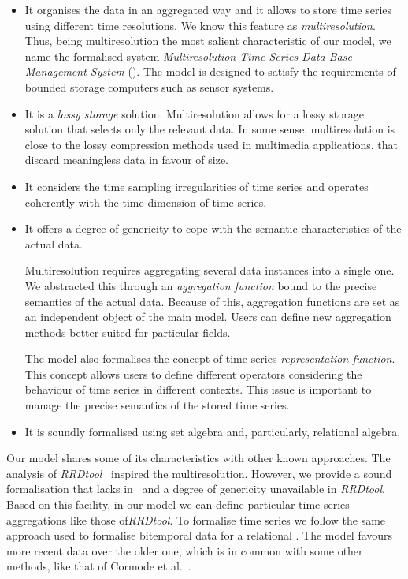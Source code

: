 \begin{itemize}

\item It organises the data in an aggregated way and it allows to
  store time series using different time resolutions. We know this
  feature as \emph{multiresolution}.  Thus, being multiresolution the
  most salient characteristic of our model, we name the formalised
  system \emph{Multiresolution Time Series Data Base Management
    System} ().  The model is designed to satisfy the
  requirements of bounded storage computers such as sensor systems.

\item It is a \emph{lossy storage} solution. Multiresolution allows
  for a lossy storage solution that selects only the relevant data. In
  some sense, multiresolution is close to the lossy compression
  methods used in multimedia applications, that discard meaningless
  data in favour of size.

\item It considers the time sampling irregularities of time series and
  operates coherently with the time dimension of time series.

\item It offers a degree of genericity to cope with the semantic
  characteristics of the actual data.

  Multiresolution requires aggregating several data instances into a
  single one. We abstracted this through an \emph{aggregation
    function} bound to the precise semantics of the actual
  data. Because of this, aggregation functions are set as an
  independent object of the main model.  Users can define new
  aggregation methods better suited for particular fields.

  The model also formalises the concept of time series
  \emph{representation function}.  This concept allows users to define
  different operators considering the behaviour of time series in
  different contexts. This issue is important to manage the precise
  semantics of the stored time series.

\item It is soundly formalised using set algebra and, particularly,
  relational algebra.

\end{itemize}

Our model shares some of its characteristics with other known
approaches. The analysis of \emph{RRDtool}~\cite{rrdtool} inspired the
multiresolution. However, we provide a sound formalisation that lacks
in~\cite{rrdtool} and a degree of genericity unavailable in
\emph{RRDtool}. Based on this facility, in our model we can define
particular time series aggregations like those of\emph{RRDtool}. To
formalise time series we follow the same approach used to formalise
bitemporal data for a relational . The model favours more
recent data over the older one, which is in common with some other
methods, like that of Cormode et al.~\cite{cormode08:pods}.


